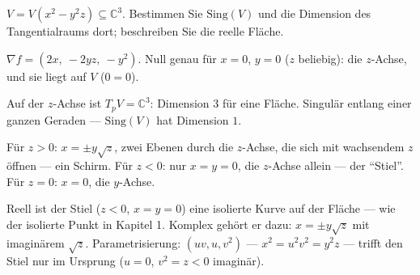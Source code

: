\begin{aufgabe}
$V = V(x^{2} - y^{2}z)\subseteq\mathbb C^{3}$. Bestimmen Sie $\mathrm{Sing}(V)$ und die Dimension des Tangentialraums dort; beschreiben Sie die reelle Fläche.

\loesung
{}
$\nabla f = (2x,\ -2yz,\ -y^{2})$. Null genau für $x = 0$, $y = 0$ ($z$ beliebig): die $z$-Achse, und sie liegt auf $V$ ($0 = 0$).

Auf der $z$-Achse ist $T_pV = \mathbb C^{3}$: Dimension $3$ für eine Fläche. Singulär entlang einer ganzen Geraden --- $\mathrm{Sing}(V)$ hat Dimension $1$.

Für $z > 0$: $x = \pm y\sqrt z$, zwei Ebenen durch die $z$-Achse, die sich mit wachsendem $z$ öffnen --- ein Schirm. Für $z < 0$: nur $x = y = 0$, die $z$-Achse allein --- der \enquote{Stiel}. Für $z = 0$: $x = 0$, die $y$-Achse.

Reell ist der Stiel ($z < 0$, $x = y = 0$) eine isolierte Kurve auf der Fläche --- wie der isolierte Punkt in Kapitel 1. Komplex gehört er dazu: $x = \pm y\sqrt z$ mit imaginärem $\sqrt z$. Parametrisierung: $(uv, u, v^{2})$ --- $x^{2} = u^{2}v^{2} = y^{2}z$ \checkmark --- trifft den Stiel nur im Ursprung ($u = 0$, $v^{2} = z < 0$ imaginär).

\begin{center}
\begin{minipage}{0.88\textwidth}
\end{minipage}
\end{center}
\end{aufgabe}

